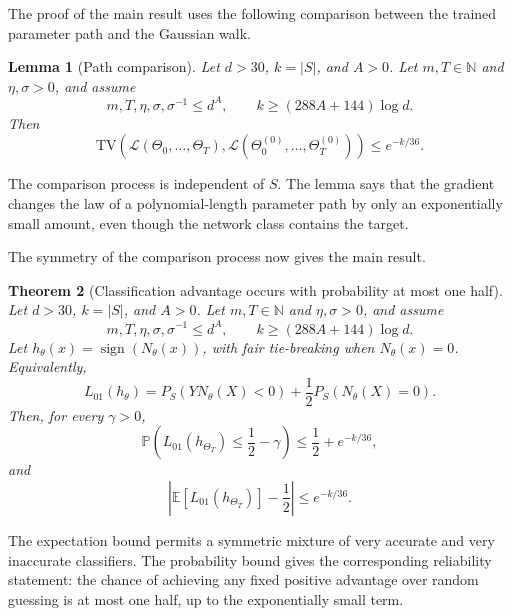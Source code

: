 \documentclass[11pt,twoside]{article}
\newcommand{\E}{\mathbb E}
\renewcommand{\P}{\mathbb P}
\newcommand{\Law}{\mathcal L}
\newcommand{\TV}{\mathrm{TV}}
\newtheorem{theorem}{Theorem}[section]
\newtheorem{lemma}[theorem]{Lemma}
\theoremstyle{definition}
\theoremstyle{remark}
\begin{document}
The proof of the main result uses the following comparison between the trained
parameter path and the Gaussian walk.

\begin{lemma}[Path comparison]
\label{lem:path-comparison}
Let $d>30$, $k=|S|$, and $A>0$. Let
\(m,T\in\mathbb N\) and \(\eta,\sigma>0\), and assume
\begin{equation}
m,T,\eta,\sigma,\sigma^{-1}\le d^A,
\qquad
k\ge(288A+144)\log d.
\label{eq:hardness-conditions}
\end{equation}
Then
\begin{equation}
\TV\!\left(
\Law(\Theta_0,\ldots,\Theta_T),
\Law(\Theta^{(0)}_0,\ldots,\Theta^{(0)}_T)
\right)
\le e^{-k/36}.
\label{eq:path-tv}
\end{equation}
\end{lemma}

The comparison process is independent of $S$. The lemma says that the
gradient changes the law of a polynomial-length parameter path by only an
exponentially small amount, even though the network class contains the target.

The symmetry of the comparison process now gives the main result.

\begin{theorem}[Classification advantage occurs with probability at most one half]
\label{thm:classification}
Let $d>30$, $k=|S|$, and $A>0$. Let
\(m,T\in\mathbb N\) and \(\eta,\sigma>0\), and assume
\[
m,T,\eta,\sigma,\sigma^{-1}\le d^A,
\qquad
k\ge(288A+144)\log d.
\]
Let $h_\theta(x)=\operatorname{sign}(N_\theta(x))$, with fair tie-breaking
when $N_\theta(x)=0$. Equivalently,
\[
L_{01}(h_\theta)
=P_S(YN_\theta(X)<0)+\frac12P_S(N_\theta(X)=0).
\]
Then, for every $\gamma>0$,
\begin{equation}
\P\!\left(L_{01}(h_{\Theta_T})\le\frac12-\gamma\right)
\le\frac12+e^{-k/36},
\label{eq:classification-probability}
\end{equation}
and
\begin{equation}
\left|\E[L_{01}(h_{\Theta_T})]-\frac12\right|
\le e^{-k/36}.
\label{eq:classification-expectation}
\end{equation}
\end{theorem}

The expectation bound permits a symmetric mixture of very accurate and very
inaccurate classifiers. The probability bound gives the corresponding
reliability statement: the chance of achieving any fixed positive advantage
over random guessing is at most one half, up to the exponentially small term.
\end{document}

